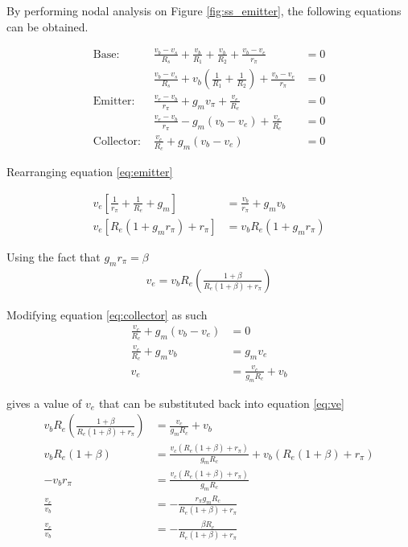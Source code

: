 \documentclass[a4paper,11pt]{article}
\begin{document}
By performing nodal analysis on Figure \ref{fig:ss_emitter}, the following equations can be obtained.

\begin{subequations}
	\begin{align}
		\textrm{Base: } &\frac{v_b - v_s}{R_s} + \frac{v_b}{R_1} + \frac{v_b}{R_2} + \frac{v_b - v_e}{r_\pi} &= 0 \nonumber \\ 
		&\frac{v_b - v_s}{R_s} + v_b \left(\frac{1}{R_1} + \frac{1}{R_2} \right) + \frac{v_b - v_e}{r_\pi} &= 0 \label{eq:base} \\
		\textrm{Emitter: }	&\frac{v_e - v_b}{r_\pi} + g_m v_\pi + \frac{v_e}{R_e} &= 0\nonumber \\ 
		&\frac{v_e - v_b}{r_\pi} - g_m (v_b-v_e) + \frac{v_e}{R_e} &= 0 \label{eq:emitter} \\
		\textrm{Collector: }	&\frac{v_c}{R_c} + g_m (v_b-v_e) &= 0\label{eq:collector}
	\end{align}
\end{subequations}

Rearranging equation \ref{eq:emitter}


\begin{align*}
		v_e [\frac{1}{r_\pi} + \frac{1}{R_e}+g_m] &= \frac{v_b}{r_\pi} + g_m v_b \\
		v_e [R_e (1+g_m r_\pi) +r_\pi] &= v_b R_e (1+g_m r_\pi)
\end{align*}

Using the fact that $g_m r_\pi=\beta$
\begin{align}
	v_e = v_b R_e (\frac{1 + \beta}{R_e (1 + \beta) + r_\pi}) \label{eq:ve}
\end{align}

Modifying equation \ref{eq:collector} as such
\begin{align*}
\frac{v_c}{R_c} + g_m (v_b-v_e) &= 0 \\ 
\frac{v_c}{R_c} + g_m v_b &= g_m v_e \\
v_e &= \frac{v_c}{g_m R_c} + v_b
\end{align*}

gives a value of $v_e$ that can be substituted back into equation \ref{eq:ve}
\begin{align*}
v_b R_e (\frac{1 + \beta}{R_e (1 + \beta) + r_\pi}) &= \frac{v_c}{g_m R_c} + v_b \\
v_b R_e (1 + \beta) &= \frac{v_c (R_e (1 + \beta) + r_\pi)}{g_m R_c} + v_b (R_e (1 + \beta) + r_\pi) \\
-v_b r_\pi &= \frac{v_c (R_e (1 + \beta) + r_\pi)}{g_m R_c} \\
\frac{v_c}{v_b} &= - \frac{r_\pi g_m R_c}{R_e (1 + \beta) + r_\pi} \\
\frac{v_c}{v_b} &= - \frac{\beta R_c}{R_e (1 + \beta) + r_\pi}
\end{align*}
\end{document}
